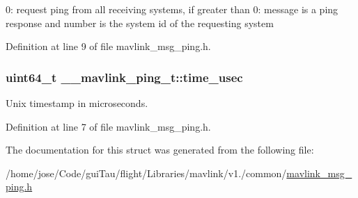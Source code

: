 0\-: request ping from all receiving systems, if greater than 0\-: message is a ping response and number is the system id of the requesting system 



Definition at line 9 of file mavlink\-\_\-msg\-\_\-ping.\-h.

\hypertarget{struct____mavlink__ping__t_a78bf2339554a175c2b5423fee61cf619}{
\subsubsection[{time\-\_\-usec}]{\setlength{\rightskip}{0pt plus 5cm}uint64\-\_\-t \-\_\-\-\_\-mavlink\-\_\-ping\-\_\-t\-::time\-\_\-usec}}\label{struct____mavlink__ping__t_a78bf2339554a175c2b5423fee61cf619}


Unix timestamp in microseconds. 



Definition at line 7 of file mavlink\-\_\-msg\-\_\-ping.\-h.



The documentation for this struct was generated from the following file\-:\begin{DoxyCompactItemize}
\item 
/home/jose/\-Code/gui\-Tau/flight/\-Libraries/mavlink/v1./common/\hyperlink{mavlink__msg__ping_8h}{mavlink\-\_\-msg\-\_\-ping.\-h}\end{DoxyCompactItemize}
